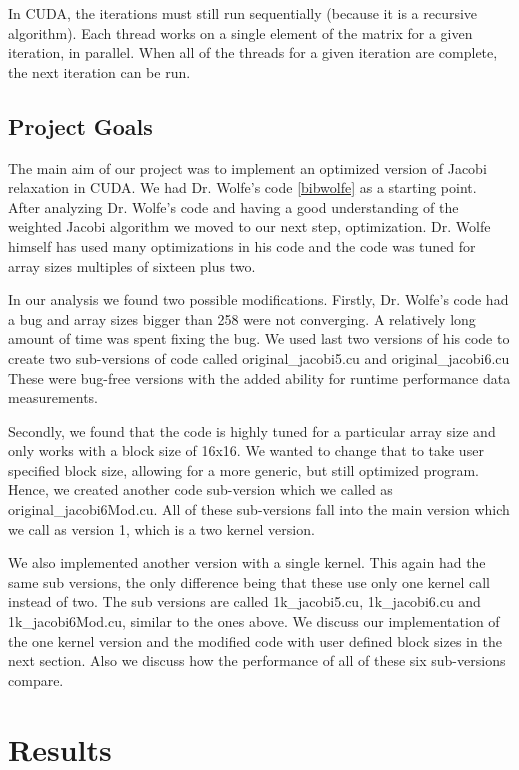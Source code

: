 \documentclass[10pt]{article}
\begin{document}
\begin{multicols}{2}
  In CUDA, the iterations must still run sequentially (because it is a recursive algorithm).
  Each thread works on a single element of the matrix for a given iteration, in parallel.
  When all of the threads for a given iteration are complete, the next iteration can be run.

  \subsection{Project Goals}
  The main aim of our project was to implement an optimized version of Jacobi relaxation in CUDA.
  We had Dr. Wolfe’s code \ref{bibwolfe} as a starting point.
  After analyzing Dr. Wolfe’s code and having a good understanding of the weighted Jacobi algorithm we moved to our next step, optimization.
  Dr. Wolfe himself has used many optimizations in his code and the code was tuned for array sizes multiples of sixteen plus two.

  In our analysis we found two possible modifications.
  Firstly, Dr. Wolfe’s code had a bug and array sizes bigger than 258 were not converging.
  A relatively long amount of time was spent fixing the bug.
  We used last two versions of his code to create two sub-versions of code called original\_jacobi5.cu and original\_jacobi6.cu 
  These were bug-free versions with the added ability for runtime performance data measurements.

  Secondly, we found that the code is highly tuned for a particular array size and only works with a block size of 16x16.
  We wanted to change that to take user specified block size, allowing for a more generic, but still optimized program.
  Hence, we created another code sub-version which we called as original\_jacobi6Mod.cu.
  All of these sub-versions fall into the main version which we call as version 1, which is a two kernel version.

  We also implemented another version with a single kernel.
  This again had the same sub versions, the only difference being that these use only one kernel call instead of two.
  The sub versions are called 1k\_jacobi5.cu, 1k\_jacobi6.cu and 1k\_jacobi6Mod.cu, similar to the ones above.
  We discuss our implementation of the one kernel version and the modified code with user defined block sizes in the next section.
  Also we discuss how the performance of all of these six sub-versions compare.

  \section{Results}
  \label{sec:results}

\end{multicols}
\end{document}
